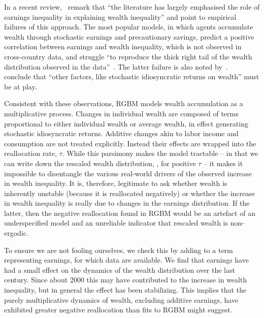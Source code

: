 In a recent review,~\cite[p.~593]{benhabib2017earnings} remark that ``the literature has largely emphasised the role of earnings inequality in explaining wealth inequality'' and point to empirical failures of this approach. The most popular models, in which agents accumulate wealth through stochastic earnings and precautionary savings, predict a positive correlation between earnings and wealth inequality, which is not observed in cross-country data, and struggle ``to reproduce the thick right tail of the wealth distribution observed in the data''~\cite[p.~593]{benhabib2017earnings}. The latter failure is also noted by~\cite{hubmer2016historical}.~\cite[p.~595]{benhabib2017earnings} conclude that ``other factors, like stochastic idiosyncratic returns on wealth'' must be at play.

Consistent with these observations, RGBM models wealth accumulation as a multiplicative process. Changes in individual wealth are composed of terms proportional to either individual wealth or average wealth, in effect generating stochastic idiosyncratic returns. Additive changes akin to labor income and consumption are not treated explicitly. Instead their effects are wrapped into the reallocation rate, $\tau$. While this parsimony makes the model tractable -- in that we can write down the rescaled wealth distribution, , for positive $\tau$ -- it makes it impossible to disentangle the various real-world drivers of the observed increase in wealth inequality. It is, therefore, legitimate to ask whether wealth is inherently unstable (because it is reallocated negatively) or whether the increase in wealth inequality is really due to changes in the earnings distribution. If the latter, then the negative reallocation found in RGBM would be an artefact of an underspecified model and an unreliable indicator that rescaled wealth is non-ergodic.

To ensure we are not fooling ourselves, we check this by adding to  a term representing earnings, for which data are available. We find that earnings have had a small effect on the dynamics of the wealth distribution over the last century. Since about 2000 this may have contributed to the increase in wealth inequality, but in general the effect has been stabilizing.
This implies that the purely multiplicative dynamics of wealth, \ie excluding additive earnings, have exhibited greater negative reallocation than fits to RGBM might suggest.

